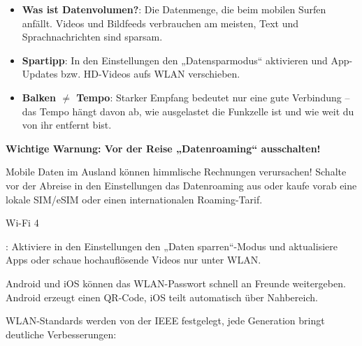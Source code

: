 
\begin{itemize}
  \item \textbf{Was ist Datenvolumen?}: Die Datenmenge, die beim mobilen Surfen anfällt. Videos und Bildfeeds verbrauchen am meisten, Text und Sprachnachrichten sind sparsam.
  \item \textbf{Spartipp}: In den Einstellungen den „Datensparmodus“ aktivieren und App-Updates bzw. HD-Videos aufs WLAN verschieben.
  \item \textbf{Balken $\neq$ Tempo}: Starker Empfang bedeutet nur eine gute Verbindung – das Tempo hängt davon ab, wie ausgelastet die Funkzelle ist und wie weit du von ihr entfernt bist.
\end{itemize}

\textbf{Wichtige Warnung: Vor der Reise „Datenroaming“ ausschalten!}\par

Mobile Daten im Ausland können himmlische Rechnungen verursachen! Schalte vor der Abreise in den Einstellungen das Datenroaming aus oder kaufe vorab eine lokale SIM/eSIM oder einen internationalen Roaming-Tarif.


Wi-Fi 4


: Aktiviere in den Einstellungen den „Daten sparren“-Modus und aktualisiere Apps oder schaue hochauflösende Videos nur unter WLAN.


Android und iOS können das WLAN-Passwort schnell an Freunde weitergeben. Android erzeugt einen QR-Code, iOS teilt automatisch über Nahbereich.


WLAN-Standards werden von der IEEE festgelegt, jede Generation bringt deutliche Verbesserungen:

